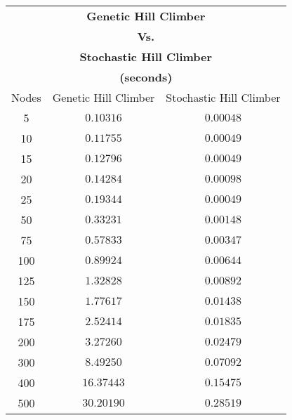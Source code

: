\begin{tabular}{c|c|c}
    \multicolumn{3}{c}{\textbf{Genetic Hill Climber}}      \\
    \multicolumn{3}{c}{\textbf{Vs.}}                       \\
    \multicolumn{3}{c}{\textbf{Stochastic Hill Climber}}   \\
    \multicolumn{3}{c}{\textbf{(seconds)}}                 \\
    \hline
    Nodes & Genetic Hill Climber & Stochastic Hill Climber \\
    \hline
    5     & $0.10316$            & $0.00048$               \\
    10    & $0.11755$            & $0.00049$               \\
    15    & $0.12796$            & $0.00049$               \\
    20    & $0.14284$            & $0.00098$               \\
    25    & $0.19344$            & $0.00049$               \\
    50    & $0.33231$            & $0.00148$               \\
    75    & $0.57833$            & $0.00347$               \\
    100   & $0.89924$            & $0.00644$               \\
    125   & $1.32828$            & $0.00892$               \\
    150   & $1.77617$            & $0.01438$               \\
    175   & $2.52414$            & $0.01835$               \\
    200   & $3.27260$            & $0.02479$               \\
    300   & $8.49250$            & $0.07092$               \\
    400   & $16.37443$           & $0.15475$               \\
    500   & $30.20190$           & $0.28519$               \\
\end{tabular}